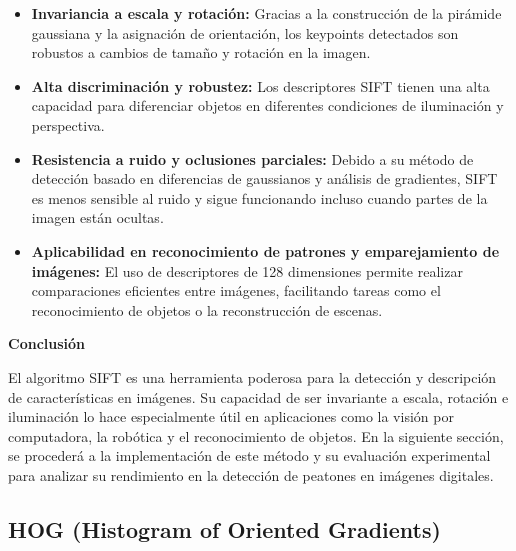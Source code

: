\documentclass[a4paper]{article}
\begin{document}
  \begin{itemize}
      \item \textbf{Invariancia a escala y rotación:}  
      Gracias a la construcción de la pirámide gaussiana y la asignación de orientación, los keypoints detectados son robustos a cambios de tamaño y rotación en la imagen.
      
      \item \textbf{Alta discriminación y robustez:}  
      Los descriptores SIFT tienen una alta capacidad para diferenciar objetos en diferentes condiciones de iluminación y perspectiva.
      
      \item \textbf{Resistencia a ruido y oclusiones parciales:}  
      Debido a su método de detección basado en diferencias de gaussianos y análisis de gradientes, SIFT es menos sensible al ruido y sigue funcionando incluso cuando partes de la imagen están ocultas.
      
      \item \textbf{Aplicabilidad en reconocimiento de patrones y emparejamiento de imágenes:}  
      El uso de descriptores de 128 dimensiones permite realizar comparaciones eficientes entre imágenes, facilitando tareas como el reconocimiento de objetos o la reconstrucción de escenas.
  \end{itemize}
  
  \par\vspace{0.5cm}
  \textbf{Conclusión}
  \par\vspace{0.5cm}
  
  El algoritmo SIFT es una herramienta poderosa para la detección y descripción de características en imágenes. Su capacidad de ser invariante a escala, rotación e iluminación lo hace especialmente útil en aplicaciones como la visión por computadora, la robótica y el reconocimiento de objetos. En la siguiente sección, se procederá a la implementación de este método y su evaluación experimental para analizar su rendimiento en la detección de peatones en imágenes digitales.
  




  \subsection{HOG (Histogram of Oriented Gradients)}
  \par\vspace{0.5cm}
\end{document}

